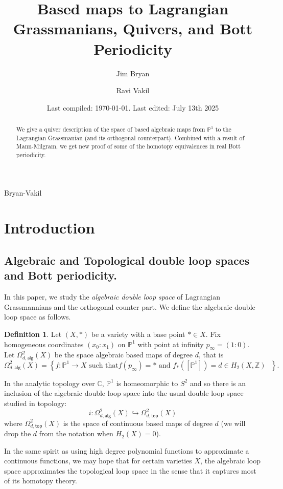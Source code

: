 \documentclass{amsart}
\title{Based maps to Lagrangian Grassmanians, Quivers, and Bott Periodicity}
\date{Last compiled:  \today.  Last edited: July 13th 2025}
\author{Jim Bryan}
\author{Ravi Vakil}
\theoremstyle{definition}
\newtheorem{definition}[theorem]{Definition}
\newcommand{\CC} {{\mathbb C}}          %
\newcommand{\ZZ} {{\mathbb Z}}		%
\newcommand{\PP}{\mathbb{P}}
\newcommand{\alg}{\mathsf{alg}}
\renewcommand{\top}{\mathsf{top}}
\newcommand{\LoopTwo}{\Omega^{2}_{d,\alg}}
\newcommand{\LoopTwoTop}{\Omega^{2}_{d,\top}}
\begin{document}
\begin{abstract}
We give a quiver description of the space of based algebraic maps from
$\PP^{1}$ to the Lagrangian Grassmanian (and its orthogonal
counterpart). Combined with a result of Mann-Milgram, we get new proof of some
of the homotopy equivalences in real Bott periodicity.
\end{abstract}

\maketitle 

  {Bryan-Vakil}


\tableofcontents
\pagebreak

\section{Introduction}\label{sec: intro}


\subsection{Algebraic and Topological double loop spaces and Bott periodicity.}

In this paper, we study the \emph{algebraic double loop space} of
Lagrangian Grassmannians and the orthogonal counter part. We define the
algebraic double loop space as follows.

\begin{definition}\label{defn: Omega2alg(X)}
Let $(X,*)$ be a variety with a base point $*\in X$. Fix homogeneous
coordinates $(x_{0}:x_{1})$ on $\PP^{1}$ with point at infinity
$p_{\infty}=(1:0)$. Let $\LoopTwo(X)$ be the space algebraic based
maps of degree $d$, that is
\[
\LoopTwo (X) = \left\{f:\PP^{1}\to X\text{ such that
$f(p_{\infty})=*$ and $f_{*}([\PP^{1}])=d\in H_{2}(X,\ZZ )$ } \right\} .
\]
\end{definition}

In the analytic topology over $\CC$, $\PP^{1}$ is homeomorphic to
$S^{2}$ and so there is an inclusion of the algebraic double loop
space into the usual double loop space studied in topology:
\[
i:\LoopTwo (X) \hookrightarrow \LoopTwoTop (X)
\]
where $\LoopTwoTop (X)$ is the space of continuous based maps of
degree $d$ (we will drop the $d$ from the notation when $H_{2}(X)=0$).

In the same spirit as using high degree polynomial functions to
approximate a continuous functions, we may hope that for certain
varieties $X$, the algebraic loop space approximates the topological
loop space in the sense that it captures most of its homotopy theory.
\end{document}

